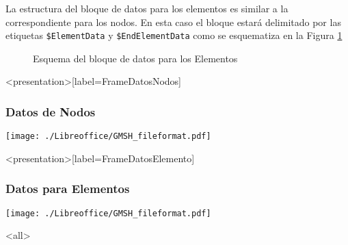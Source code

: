 La estructura del bloque de datos para los elementos
es similar a la correspondiente para los nodos. 
En esta caso el bloque estará delimitado por las
etiquetas \texttt{\$ElementData} y 
\texttt{\$EndElementData} como se esquematiza en la 
Figura \ref{FiguraDatosElementos} 

\begin{figure}

  \caption{Esquema del bloque de datos para los 
  Elementos\label{FiguraDatosElementos} }

\end{figure}

\mode* 

\begin{frame}<presentation>[label=FrameDatosNodos]
  \frametitle{Datos de Nodos}
  \texttt{[image: ./Libreoffice/GMSH\_fileformat.pdf]}



\end{frame}


\begin{frame}<presentation>[label=FrameDatosElemento]
  \frametitle{Datos para Elementos}
  \texttt{[image: ./Libreoffice/GMSH\_fileformat.pdf]}

\end{frame}

\mode<all>
